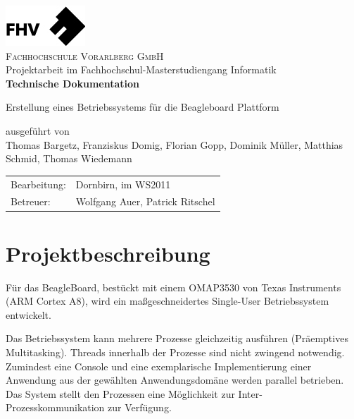 \documentclass[10pt,a4paper,fleqn]{article}
\begin{document}
	
\pagestyle{empty}


\begin{center}
\includegraphics{images/fhv-logo}\\
\textsc{Fachhochschule Vorarlberg GmbH}\\
Projektarbeit im Fachhochschul-Masterstudiengang Informatik\\

\vspace{5cm}
{\large\textbf{Technische Dokumentation}}\vspace{.5cm}

{\LARGE Erstellung eines Betriebssystems für die Beagleboard Plattform}\vspace{1cm}

ausgeführt von\\
{\large
	Thomas Bargetz, Franziskus Domig, Florian Gopp, Dominik Müller,
	Matthias Schmid, Thomas Wiedemann
}\\


\end{center}
\vfill

\begin{tabular}{ll}
Bearbeitung: & Dornbirn, im WS2011\\
Betreuer: & Wolfgang Auer, Patrick Ritschel\\
\end{tabular}

\clearpage

\pagestyle{plain}

\tableofcontents

\clearpage

\section{Projektbeschreibung}
	Für das BeagleBoard, bestückt mit einem OMAP3530 von Texas Instruments (ARM Cortex A8),
		wird ein maßgeschneidertes Single-User Betriebssystem entwickelt.
		
	Das Betriebssystem kann mehrere Prozesse gleichzeitig ausführen (Präemptives Multitasking).
		Threads innerhalb der Prozesse sind nicht zwingend notwendig. Zumindest eine Console
		und eine exemplarische Implementierung einer Anwendung aus der gewählten Anwendungsdomäne
		werden parallel betrieben. Das System stellt den Prozessen eine Möglichkeit zur
		Inter-Prozesskommunikation zur Verfügung.
		
\end{document}
